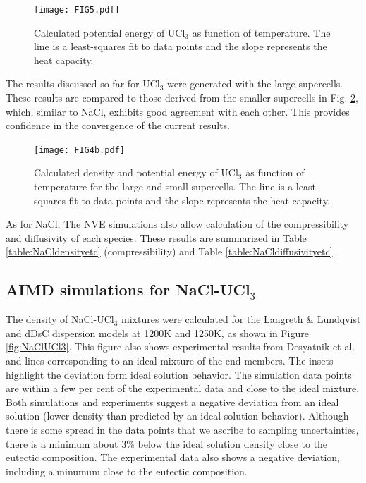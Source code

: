 \documentclass[preprint,3p,10pt,twocolumn,number,sort&compress]{elsarticle}
\begin{document}
\begin{figure}[htb]
\centering
\texttt{[image: FIG5.pdf]}
\caption{Calculated potential energy of UCl$_3$ as function of temperature. The line is a least-squares fit to data points and the slope represents the heat capacity.} 
\label{fig:UCl3heat}
\end{figure}


The results discussed so far for UCl$_3$ were generated with the large supercells. These results are compared to those derived from the smaller supercells in Fig. \ref{fig:UCl3size}, which, similar to NaCl, exhibits good agreement with each other. This provides confidence in the convergence of the current results.

\begin{figure}[htb]
\centering
\texttt{[image: FIG4b.pdf]}
\caption{Calculated density and potential energy of UCl$_3$ as function of temperature for the large and small supercells. The line is a least-squares fit to data points and the slope represents the heat capacity.} 
\label{fig:UCl3size}
\end{figure}

As for NaCl, The NVE simulations also allow calculation of the compressibility and diffusivity of each species. These results are  summarized in Table \ref{table:NaCldensityetc} (compressibility) and Table \ref{table:NaCldiffusivityetc}.
 
\subsection{AIMD simulations for NaCl-UCl$_3$}
The density of NaCl-UCl$_3$ mixtures were calculated for the Langreth \& Lundqvist and dDsC dispersion models at 1200K and 1250K, as shown in Figure \ref{fig:NaClUCl3}. This figure also shows experimental results from Desyatnik et al.~\cite{} and lines corresponding to an ideal mixture of the end members. The insets highlight the deviation form ideal solution behavior. The simulation data points are within a few per cent of the experimental data and close to the ideal mixture. Both simulations and experiments suggest a negative deviation from an ideal solution (lower density than predicted by an ideal solution behavior). Although there is some spread in the data points that we ascribe to sampling uncertainties, there is a minimum about 3\% below the ideal solution density close to the eutectic composition. The experimental data also shows a negative deviation, including a minumum close to the eutectic composition.  
\end{document}
